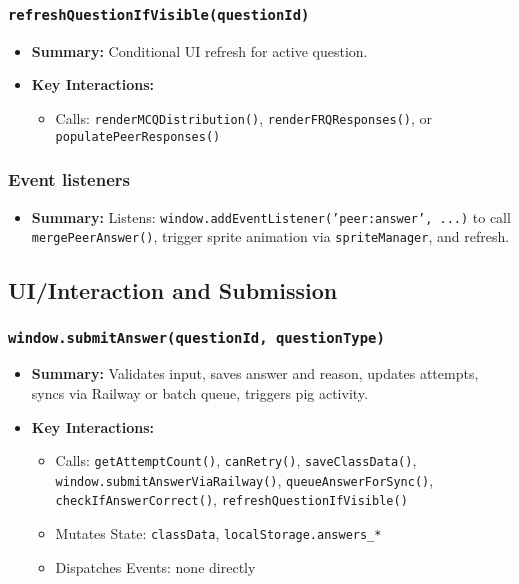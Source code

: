 \documentclass[11pt,letterpaper]{article}
\begin{document}
\subsubsection{\texttt{refreshQuestionIfVisible(questionId)}}
\begin{itemize}
    \item \textbf{Summary:} Conditional UI refresh for active question.
    \item \textbf{Key Interactions:}
    \begin{itemize}
        \item Calls: \texttt{renderMCQDistribution()}, \texttt{renderFRQResponses()}, or \texttt{populatePeerResponses()}
    \end{itemize}
\end{itemize}

\subsubsection{Event listeners}
\begin{itemize}
    \item \textbf{Summary:} Listens: \texttt{window.addEventListener('peer:answer', ...)} to call \texttt{mergePeerAnswer()}, trigger sprite animation via \texttt{spriteManager}, and refresh.
\end{itemize}

\subsection{UI/Interaction and Submission}

\subsubsection{\texttt{window.submitAnswer(questionId, questionType)}}
\begin{itemize}
    \item \textbf{Summary:} Validates input, saves answer and reason, updates attempts, syncs via Railway or batch queue, triggers pig activity.
    \item \textbf{Key Interactions:}
    \begin{itemize}
        \item Calls: \texttt{getAttemptCount()}, \texttt{canRetry()}, \texttt{saveClassData()}, \texttt{window.submitAnswerViaRailway()}, \texttt{queueAnswerForSync()}, \texttt{checkIfAnswerCorrect()}, \texttt{refreshQuestionIfVisible()}
        \item Mutates State: \texttt{classData}, \texttt{localStorage.answers\_*}
        \item Dispatches Events: none directly
    \end{itemize}
\end{itemize}
\end{document}
